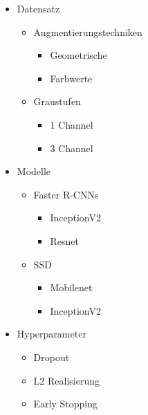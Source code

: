 \begin{itemize}
    \item Datensatz
    \begin{itemize}
        \item Augmentierungstechniken
        \begin{itemize}
            \item Geometrische
            \item Farbwerte
        \end{itemize}
        \item Graustufen
        \begin{itemize}
            \item 1 Channel
            \item 3 Channel
        \end{itemize}
    \end{itemize}
    \item Modelle
    \begin{itemize}
        \item Faster R-CNNs
        \begin{itemize}
            \item InceptionV2
            \item Resnet
        \end{itemize}
        \item SSD
        \begin{itemize}
            \item Mobilenet
            \item InceptionV2
        \end{itemize}
    \end{itemize}
    \item Hyperparameter
    \begin{itemize}
        \item Dropout
        \item L2 Realisierung
        \item Early Stopping
    \end{itemize}
\end{itemize}



